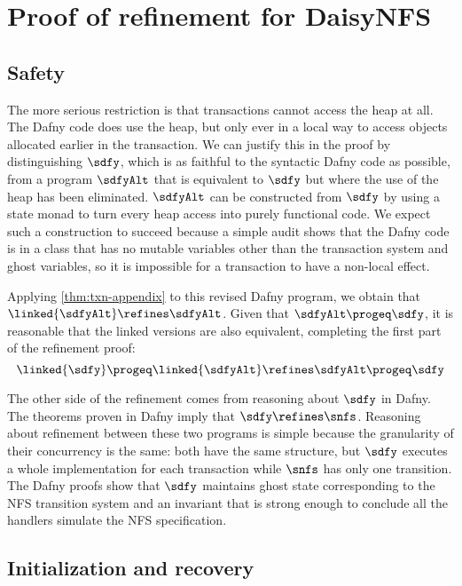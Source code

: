 \section{Proof of refinement for DaisyNFS}
\label{appendix:proof}

\subsection{Safety}

The more serious restriction is that transactions cannot access the heap at all.
The Dafny code does use the heap, but only ever in a local way to access objects
allocated earlier in the transaction. We can justify this in the proof by
distinguishing $\sdfy$, which is as faithful to the syntactic Dafny code as
possible, from a program $\sdfyAlt$ that is equivalent to $\sdfy$ but where the
use of the heap has been eliminated. $\sdfyAlt$ can be constructed from $\sdfy$
by using a state monad to turn every heap access into purely functional code.
We expect such a construction to succeed because
a simple audit shows that the Dafny code is in a class that has no mutable
variables other than the transaction system and ghost variables,
so it is impossible for a transaction to have a non-local effect.

Applying \cref{thm:txn-appendix} to this revised Dafny program, we obtain that
$\linked{\sdfyAlt} \refines \sdfyAlt$. Given that $\sdfyAlt \progeq \sdfy$, it is
reasonable that the linked versions are also equivalent, completing the first
part of the refinement proof:
\[
  \linked{\sdfy} \progeq \linked{\sdfyAlt} \refines \sdfyAlt \progeq \sdfy
\]

The other side of the refinement comes from reasoning about $\sdfy$ in Dafny.
The theorems proven in Dafny imply that $\sdfy \refines \snfs$. Reasoning about
refinement between these two programs is simple because the granularity of their
concurrency is the same: both have the same structure, but $\sdfy$ executes a
whole implementation for each transaction while $\snfs$ has only one transition.
The Dafny proofs show that $\sdfy$ maintains ghost state corresponding to the
NFS transition system and an invariant that is strong enough to conclude all the
handlers simulate the NFS specification.

\subsection{Initialization and recovery}

